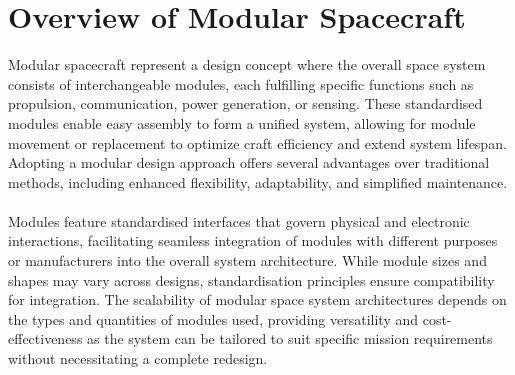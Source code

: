 \section{Overview of Modular Spacecraft}
Modular spacecraft represent a design concept where the overall space system consists of interchangeable modules, each fulfilling specific functions such as propulsion, communication, power generation, or sensing. These standardised modules enable easy assembly to form a unified system, allowing for module movement or replacement to optimize craft efficiency and extend system lifespan. Adopting a modular design approach offers several advantages over traditional methods, including enhanced flexibility, adaptability, and simplified maintenance.
\\\\
Modules feature standardised interfaces that govern physical and electronic interactions, facilitating seamless integration of modules with different purposes or manufacturers into the overall system architecture. While module sizes and shapes may vary across designs, standardisation principles ensure compatibility for integration. The scalability of modular space system architectures depends on the types and quantities of modules used, providing versatility and cost-effectiveness as the system can be tailored to suit specific mission requirements without necessitating a complete redesign.
